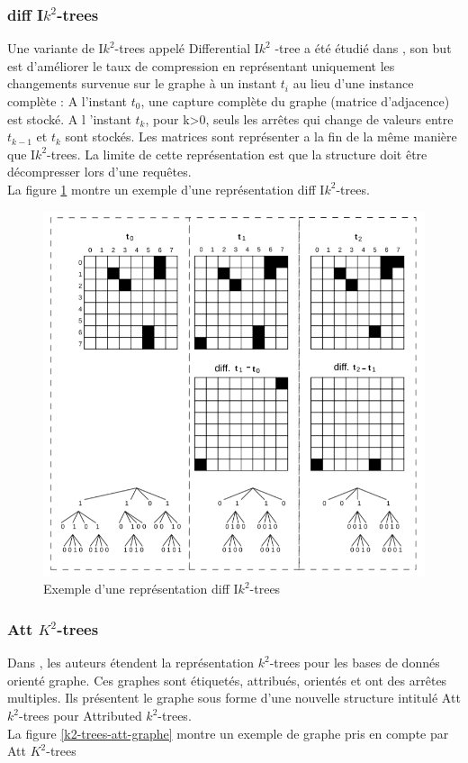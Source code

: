 \subsubsection{diff I$k^2$-trees}
Une variante de I$k^2$-trees appelé Differential I$k^2$
-tree a été étudié dans \citep{alvarez2017succinct}, son but est d'améliorer le taux de compression en représentant uniquement les changements survenue sur le graphe à un instant $t_i$ au lieu d'une instance complète : A l'instant $t_0$, une capture complète du graphe (matrice d'adjacence) est stocké. A l 'instant $t_k$, pour k>0, seuls les arrêtes qui change de valeurs entre $t_{k-1}$ et $t_k$ sont stockés. Les matrices sont représenter a la fin de la même manière que I$k^2$-trees. La limite de cette représentation est que la structure doit être décompresser lors d'une requêtes. \\
La figure \ref{Ik2-trees-diff} montre un exemple d'une représentation diff I$k^2$-trees.

\begin{figure}[H]
\begin{center}
\includegraphics[height=200 pt, width=380 pt]{./ressources/image/Ik2-trees-diff.png} 
\end{center}
\caption{Exemple d'une représentation diff I$k^2$-trees}
\label{Ik2-trees-diff}
\end{figure}

\subsubsection{Att $K^2$-trees }
Dans \citep{alvarez2018compact}, les auteurs étendent la représentation $k^2$-trees pour les bases de donnés orienté graphe. Ces graphes sont étiquetés, attribués, orientés et ont des arrêtes multiples. Ils présentent le graphe sous forme d'une nouvelle structure intitulé Att $k^2$-trees pour Attributed $k^2$-trees.\\
La figure \ref{k2-trees-att-graphe} montre un exemple de graphe pris en compte par Att $K^2$-trees

